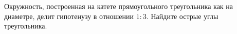 \begin{ex}
	\begin{condition}
		Окружность, построенная на катете прямоугольного треугольника как на диаметре, делит гипотенузу в отношении \( 1 : 3 \). Найдите острые углы треугольника.
	\end{condition}
\end{ex}
